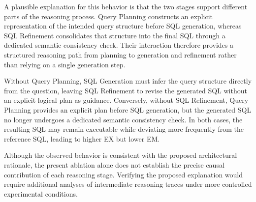 \documentclass{svproc}
\begin{document}


A plausible explanation for this behavior is that the two stages support different parts of the reasoning process. Query Planning constructs an explicit representation of the intended query structure before SQL generation, whereas SQL Refinement consolidates that structure into the final SQL through a dedicated semantic consistency check. Their interaction therefore provides a structured reasoning path from planning to generation and refinement rather than relying on a single generation step.


Without Query Planning, SQL Generation must infer the query structure directly from the question, leaving SQL Refinement to revise the generated SQL without an explicit logical plan as guidance. Conversely, without SQL Refinement, Query Planning provides an explicit plan before SQL generation, but the generated SQL no longer undergoes a dedicated semantic consistency check. In both cases, the resulting SQL may remain executable while deviating more frequently from the reference SQL, leading to higher EX but lower EM.

Although the observed behavior is consistent with the proposed architectural rationale, the present ablation alone does not establish the precise causal contribution of each reasoning stage. Verifying the proposed explanation would require additional analyses of intermediate reasoning traces under more controlled experimental conditions.
\end{document}
